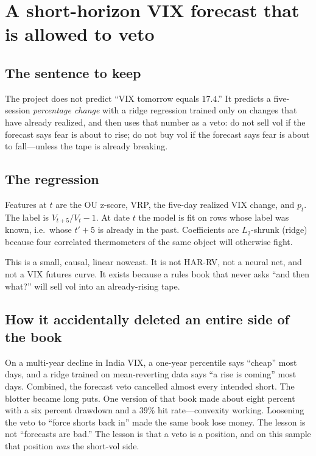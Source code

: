 \documentclass[11pt,a4paper]{article}
\begin{document}
\section{A short-horizon VIX forecast that is allowed to veto}
\label{ch:forecast}

\subsection{The sentence to keep}

The project does not predict ``VIX tomorrow equals $17.4$.'' It predicts a five-session \emph{percentage change} with a ridge regression trained only on changes that have already realized, and then uses that number as a veto: do not sell vol if the forecast says fear is about to rise; do not buy vol if the forecast says fear is about to fall---unless the tape is already breaking.

\subsection{The regression}

Features at $t$ are the OU z-score, VRP, the five-day realized VIX change, and $p_t$. The label is $V_{t+5}/V_t-1$. At date $t$ the model is fit on rows whose label was known, i.e.\ whose $t'+5$ is already in the past. Coefficients are $L_2$-shrunk (ridge) because four correlated thermometers of the same object will otherwise fight.

This is a small, causal, linear nowcast. It is not HAR-RV, not a neural net, and not a VIX futures curve. It exists because a rules book that never asks ``and then what?'' will sell vol into an already-rising tape.

\subsection{How it accidentally deleted an entire side of the book}

On a multi-year decline in India VIX, a one-year percentile says ``cheap'' most days, and a ridge trained on mean-reverting data says ``a rise is coming'' most days. Combined, the forecast veto cancelled almost every intended short. The blotter became long puts. One version of that book made about eight percent with a six percent drawdown and a $39\%$ hit rate---convexity working. Loosening the veto to ``force shorts back in'' made the same book lose money. The lesson is not ``forecasts are bad.'' The lesson is that a veto is a position, and on this sample that position \emph{was} the short-vol side.
\end{document}

